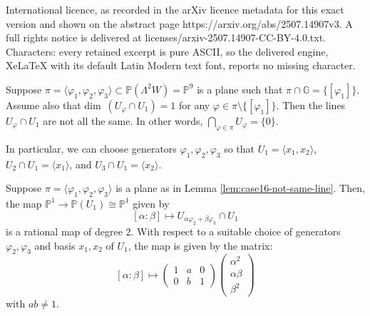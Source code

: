 \documentclass[10pt,a4paper]{amsart}
\newcommand{\GG}{\mathbb{G}}
\newcommand{\PP}{\mathbb P}
\newcommand{\f}{\varphi}
\newcommand{\la}{\langle}
\newcommand{\ra}{\rangle}
\renewcommand{\L}{\Lambda}
\renewcommand{\a}{\alpha}
\renewcommand{\b}{\beta}
\begin{document}
International licence, as recorded in the arXiv licence metadata for this exact version and shown on the abstract page https://arxiv.org/abs/2507.14907v3. A full rights notice is delivered at licenses/arxiv-2507.14907-CC-BY-4.0.txt. Characters: every retained excerpt is pure ASCII, so the delivered engine, XeLaTeX with its default Latin Modern text font, reports no missing character.
\begin{lemma} \label{lem:case16-not-same-line} 
Suppose $\pi =\la \f_1, \f_2, \f_3 \ra \subset \PP(\L^2 W)=\PP^9$ is a plane such that $\pi \cap \GG=\{[\f_1]\}$. Assume also that dim~$(U_{\f} \cap U_1)=1$ for any $\f \in \pi \setminus \{[\f_1]\}$. Then the lines $U_{\f} \cap U_1$ are not all the same. In other words, $\bigcap_{\f \in \pi} U_{\f}=\{0\}$. 

\noindent In particular, we can choose generators $\f_1, \f_2, \f_3$ so that $U_1=\la x_1, x_2 \ra$, $U_2 \cap U_1=\la x_1 \ra$, and $U_3 \cap U_1=\la x_2 \ra$.
\end{lemma}

\begin{lemma} \label{lem:rational-map}
Suppose $\pi =\la \f_1, \f_2, \f_3 \ra$ is a plane as in Lemma \ref{lem:case16-not-same-line}. Then, the map $\PP^1 \to \PP(U_1) \cong \PP^1$ given by
\[
[\a:\b] \mapsto U_{\a\f_2+\b\f_3} \cap U_1
\]
is a rational map of degree 2. With respect to a suitable choice of generators $\f_2, \f_3$ and basis $x_1,x_2$ of $U_1$, the map is given by the matrix:
\[
[\a : \b] \mapsto 
\begin{pmatrix}
    1 & a & 0 \\
    0 & b & 1
\end{pmatrix} 
\begin{pmatrix}
    \a^2 \\
    \a \b \\
    \b^2
\end{pmatrix}
\]
with $ab \ne 1$.
\end{lemma}
\end{document}
